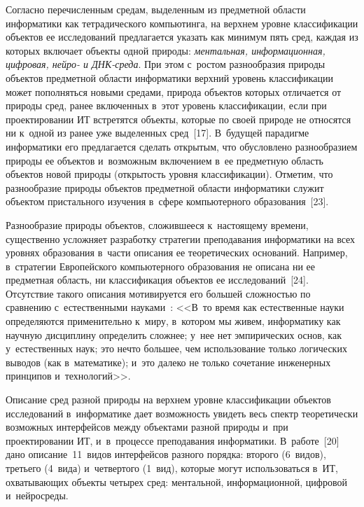 {\begin{multicols}{2}
  Согласно перечисленным средам, выделенным из предметной об\-ласти 
информатики как тет\-ра\-ди\-че\-ско\-го компьютинга, на верхнем уровне 
классификации объектов ее исследований предлагается указать как минимум 
пять сред, каждая из которых включает объекты одной природы: 
\textit{ментальная, информационная, циф\-ро\-вая, нейро- и ДНК-среда}.
  При этом с~ростом разнообразия природы объектов предметной об\-ласти 
информатики верх\-ний уровень классификации может пополняться новыми 
средами, природа объектов которых отличается от природы сред, ранее 
включенных в~этот уровень классификации, если при проектировании ИТ 
встретятся объекты, которые по своей природе не относятся ни к~одной из 
ранее уже выделенных сред~[17]. В~будущей парадигме информатики его 
предлагается сделать открытым, что обуслов\-ле\-но разнообразием природы ее 
объектов и~возможным включением в~ее предметную об\-ласть объектов 
новой природы (от\-кры\-тость уровня классификации). Отметим, что 
разнообразие природы объектов предметной об\-ласти информатики служит 
объектом пристального изуче\-ния в~сфере компьютерного образования~[23].
  
  Разнообразие природы объектов, сложившееся к~на\-сто\-яще\-му времени, 
существенно усложняет разработку стратегии преподавания информатики на 
всех уровнях образования в~час\-ти описания ее тео\-ре\-ти\-че\-ских оснований. 
Например, в~стратегии Европейского компьютерного образования не 
описана ни ее предметная об\-ласть, ни классификация объектов ее 
исследований~[24]. Отсутствие такого описания мотивируется его большей 
слож\-ностью по срав\-не\-нию с~естественными науками~\cite[с.~7]{25-zac}:
    <<В~то время как естественные науки определяются применительно 
к~миру, в~котором мы живем, информатику как научную дисциплину 
определить слож\-нее; у~нее нет эмпирических основ, как у~естественных 
наук; это нечто большее, чем использование только логических выводов (как 
в~математике); и~это далеко не только сочетание инженерных принципов 
и~технологий>>.
  
  Описание сред разной природы на верхнем уровне классификации 
объектов исследований в~информатике дает воз\-мож\-ность увидеть весь 
спектр тео\-ре\-ти\-че\-ски воз\-мож\-ных интерфейсов меж\-ду объектами разной 
природы и~при проектировании ИТ, и~в~процессе преподавания 
информатики. В~работе~[20] дано описание~11~видов интерфейсов разного 
порядка: второго (6~видов), третьего (4~вида) и~четвертого (1~вид), которые 
могут использоваться в~ИТ, охва\-ты\-ва\-ющих объекты четырех сред: 
ментальной, информационной, циф\-ро\-вой и~нейросреды.
  

\end{multicols}}
